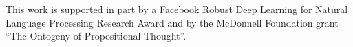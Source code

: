 This work is supported in part by a Facebook Robust Deep Learning for Natural Language Processing Research Award and by the McDonnell Foundation grant ``The Ontogeny of Propositional Thought''.